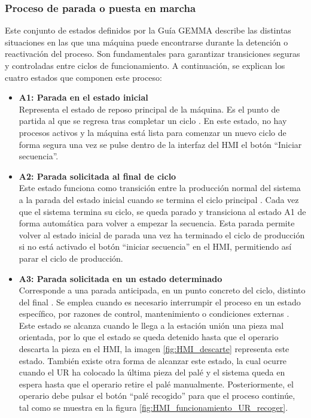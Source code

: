 \subsubsection{Proceso de parada o puesta en marcha}

Este conjunto de estados definidos por la Guía GEMMA describe las distintas situaciones en las que una máquina puede encontrarse durante la detención o reactivación del proceso. Son fundamentales para garantizar transiciones seguras y controladas entre ciclos de funcionamiento. A continuación, se explican los cuatro estados que componen este proceso:

\begin{itemize}
    \item \textbf{A1: Parada en el estado inicial} \\
    Representa el estado de reposo principal de la máquina. Es el punto de partida al que se regresa tras completar un ciclo \cite{guia_gemma}. En este estado, no hay procesos activos y la máquina está lista para comenzar un nuevo ciclo de forma segura una vez se pulse dentro de la interfaz del HMI el botón ``Iniciar secuencia''.

    \item \textbf{A2: Parada solicitada al final de ciclo} \\
    Este estado funciona como transición entre la producción normal del sistema a la parada del estado inicial cuando se termina el ciclo principal \cite{guia_gemma}. Cada vez que el sistema termina su ciclo, se queda parado y transiciona al estado A1 de forma automática para volver a empezar la secuencia. Esta parada permite volver al estado inicial de parada una vez ha terminado el ciclo de producción si no está activado el botón ``iniciar secuencia'' en el HMI, permitiendo así parar el ciclo de producción.
    
    \item \textbf{A3: Parada solicitada en un estado determinado} \\
    Corresponde a una parada anticipada, en un punto concreto del ciclo, distinto del final \cite{guia_gemma}. Se emplea cuando es necesario interrumpir el proceso en un estado específico, por razones de control, mantenimiento o condiciones externas \cite{guia_gemma}. Este estado se alcanza cuando le llega a la estación unión una pieza mal orientada, por lo que el estado se queda detenido hasta que el operario descarta la pieza en el HMI, la imagen \ref{fig:HMI_descarte} representa este estado. También existe otra forma de alcanzar este estado, la cual ocurre cuando el UR ha colocado la última pieza del palé y el sistema queda en espera hasta que el operario retire el palé manualmente. Posteriormente, el operario debe pulsar el botón “palé recogido” para que el proceso continúe, tal como se muestra en la figura \ref{fig:HMI_funcionamiento_UR_recoger}. \\


\end{itemize}
